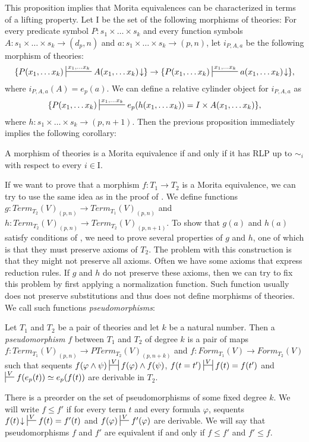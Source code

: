 \documentclass[reqno]{amsart}
\theoremstyle{definition}
\theoremstyle{remark}
\newcommand{\I}{\mathrm{I}}
\numberwithin{figure}{section}
\begin{document}
This proposition implies that Morita equivalences can be characterized in terms of a lifting property.
Let $\I$ be the set of the following morphisms of theories:
For every predicate symbol $P : s_1 \times \ldots \times s_k$ and every function symbols $A : s_1 \times \ldots \times s_k \to (d_p,n)$ and $a : s_1 \times \ldots \times s_k \to (p,n)$,
let $i_{P,A,a}$ be the following morphism of theories:
\[ \{ P(x_1, \ldots x_k) \sststile{}{x_1, \ldots x_k} A(x_1, \ldots x_k)\!\downarrow \} \to \{ P(x_1, \ldots x_k) \sststile{}{x_1, \ldots x_k} a(x_1, \ldots x_k)\!\downarrow \}, \]
where $i_{P,A,a}(A) = e_p(a)$.
We can define a relative cylinder object for $i_{P,A,a}$ as
\[ \{ P(x_1, \ldots x_k) \sststile{}{x_1, \ldots x_k} e_p(h(x_1, \ldots x_k)) = I \times A(x_1, \ldots x_k) \}, \]
where $h : s_1 \times \ldots \times s_k \to (p,n+1)$.
Then the previous proposition immediately implies the following corollary:

\begin{cor}
A morphism of theories is a Morita equivalence if and only if it has RLP up to $\sim_i$ with respect to every $i \in \I$.
\end{cor}

If we want to prove that a morphism $f : T_1 \to T_2$ is a Morita equivalence, we can try to use the same idea as in the proof of \cite[Lemma~3.7]{alg-models}.
We define functions $g : Term_{T_2}(V)_{(p,n)} \to Term_{T_1}(V)_{(p,n)}$ and $h : Term_{T_2}(V)_{(p,n)} \to Term_{T_2}(V)_{(p,n+1)}$.
To show that $g(a)$ and $h(a)$ satisfy conditions of , we need to prove several properties of $g$ and $h$,
one of which is that they must preserve axioms of $T_2$.
The problem with this construction is that they might not preserve all axioms.
Often we have some axioms that express reduction rules.
If $g$ and $h$ do not preserve these axioms, then we can try to fix this problem by first applying a normalization function.
Such function usually does not preserve substitutions and thus does not define morphisms of theories.
We call such functions \emph{pseudomorphisms}:

\begin{defn}
Let $T_1$ and $T_2$ be a pair of theories and let $k$ be a natural number.
Then a \emph{pseudomorphism} $f$ between $T_1$ and $T_2$ of degree $k$ is a pair of maps $f : Term_{T_1}(V)_{(p,n)} \to PTerm_{T_2}(V)_{(p,n+k)}$ and
$f : Form_{T_1}(V) \to Form_{T_2}(V)$ such that sequents $f(\varphi \land \psi) \ssststile{}{V} f(\varphi) \land f(\psi)$,
$f(t = t') \ssststile{}{V} f(t) = f(t')$ and $\sststile{}{V} f(e_p(t)) \simeq e_p(f(t))$ are derivable in $T_2$.

There is a preorder on the set of pseudomorphisms of some fixed degree $k$.
We will write $f \leq f'$ if for every term $t$ and every formula $\varphi$,
sequents $f(t)\!\downarrow\ \sststile{}{V} f(t) = f'(t)$ and $f(\varphi) \sststile{}{V} f'(\varphi)$ are derivable.
We will say that pseudomorphisms $f$ and $f'$ are equivalent if and only if $f \leq f'$ and $f' \leq f$.
\end{defn}
\end{document}

